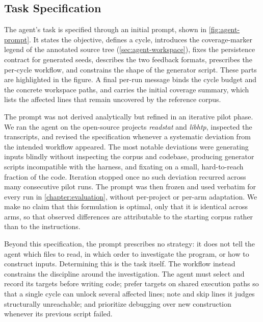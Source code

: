 \subsection{Task Specification}
\label{sec:agent-prompt}

The agent's task is specified through an initial prompt, shown in \cref{fig:agent-prompt}.
It states the objective, defines a cycle, introduces the coverage-marker legend of the annotated source tree (\cref{sec:agent-workspace}), fixes the persistence contract for generated seeds, describes the two feedback formats, prescribes the per-cycle workflow, and constrains the shape of the generator script.
These parts are highlighted in the figure.
A final per-run message binds the cycle budget and the concrete workspace paths, and carries the initial coverage summary, which lists the affected lines that remain uncovered by the reference corpus.



The prompt was not derived analytically but refined in an iterative pilot phase.
We ran the agent on the open-source projects \emph{readstat} and \emph{libhtp}, inspected the transcripts, and revised the specification whenever a systematic deviation from the intended workflow appeared.
The most notable deviations were generating inputs blindly without inspecting the corpus and codebase, producing generator scripts incompatible with the harness, and fixating on a small, hard-to-reach fraction of the code.
Iteration stopped once no such deviation recurred across many consecutive pilot runs.
The prompt was then frozen and used verbatim for every run in \cref{chapter:evaluation}, without per-project or per-arm adaptation.
We make no claim that this formulation is optimal, only that it is identical across arms, so that observed differences are attributable to the starting corpus rather than to the instructions.

Beyond this specification, the prompt prescribes no strategy: it does not tell the agent which files to read, in which order to investigate the program, or how to construct inputs.
Determining this is the task itself.
The workflow instead constrains the discipline around the investigation.
The agent must select and record its targets before writing code; prefer targets on shared execution paths so that a single cycle can unlock several affected lines; note and skip lines it judges structurally unreachable; and prioritize debugging over new construction whenever its previous script failed.

